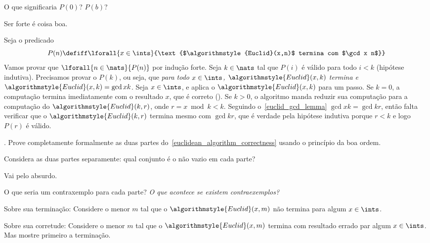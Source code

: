 \hint O que significaria $P(0)$?  $P(b)$?

\hint Ser forte é coisa boa.

\solution
\def\Euclid{\algorithmstyle{Euclid}}%
Seja o predicado
$$
P(n) \defiff \lforall {x\in\ints} {\text{$\Euclid(x,n)$ termina com $\gcd x n$}}
$$
Vamos provar que $\lforall {n\in\nats} {P(n)}$ por indução forte.
Seja $k\in\nats$ tal que $P(i)$ é válido para todo $i<k$ (hipótese indutiva).
Precisamos provar o $P(k)$, ou seja, que
\emph{para todo $x\in\ints$, $\Euclid(x,k)$ termina e $\Euclid(x,k) = \gcd x k$}.
Seja $x\in\ints$, e aplica o $\Euclid(x,k)$ para um passo.
Se $k=0$, a computação termina imediatamente com o resultado $x$, que é correto
().
Se $k>0$, o algoritmo manda reduzir sua computação para a computação do $\Euclid(k,r)$,
onde $r = x \bmod k < k$.  Seguindo o~\ref{euclid_gcd_lemma} $\gcd x k = \gcd k r$, então
falta verificar que o $\Euclid(k,r)$ termina mesmo com $\gcd k r$,
que é verdade pela hipótese indutiva porque $r < k$ e logo $P(r)$ é válido.

\endproblem

\problem.
\label{euclidean_algorithm_correctness_formal_proof_by_wop}
Prove completamente formalmente as duas partes
do~\ref{euclidean_algorithm_correctness} usando o princípio da boa ordem.

\hint
Considera as duas partes separamente:
qual conjunto é o não vazio em cada parte?

\hint
Vai pelo absurdo.

\hint
O que seria um contraxemplo para cada parte?
\emph{O que acontece se existem contraexemplos?}

\hint 
\def\Euclid{\algorithmstyle{Euclid}}%
Sobre sua terminação:
Considere o menor $m$ tal que o $\Euclid(x,m)$ não termina
para algum $x\in\ints$.

\hint
\def\Euclid{\algorithmstyle{Euclid}}%
Sobre sua corretude:
Considere o menor $m$ tal que o $\Euclid(x,m)$
termina com resultado errado par algum $x\in\ints$.
Mas mostre primeiro a terminação.

